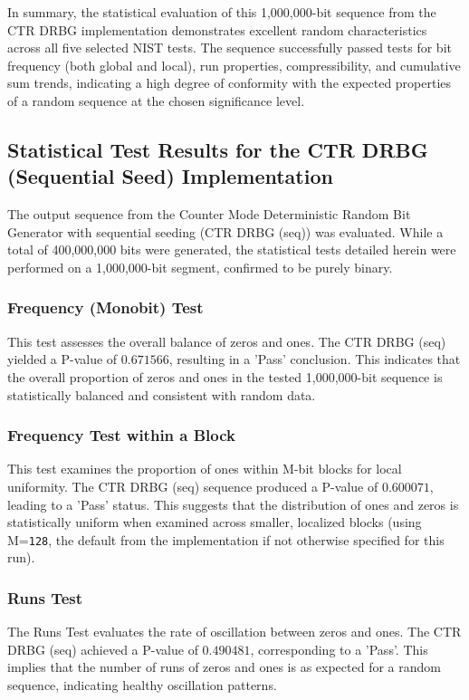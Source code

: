 \noindent 
In summary, the statistical evaluation of this 1,000,000-bit sequence from the CTR DRBG implementation demonstrates excellent random characteristics across all five selected NIST tests. The sequence successfully passed tests for bit frequency (both global and local), run properties, compressibility, and cumulative sum trends, indicating a high degree of conformity with the expected properties of a random sequence at the chosen significance level.

\subsection{Statistical Test Results for the CTR DRBG (Sequential Seed) Implementation} 

The output sequence from the Counter Mode Deterministic Random Bit Generator with sequential seeding (CTR DRBG (seq)) was evaluated. While a total of 400,000,000 bits were generated, the statistical tests detailed herein were performed on a 1,000,000-bit segment, confirmed to be purely binary. 

\subsubsection{\textbf{Frequency (Monobit) Test}}
This test assesses the overall balance of zeros and ones. The CTR DRBG (seq) yielded a P-value of $0.671566$, resulting in a 'Pass' conclusion. This indicates that the overall proportion of zeros and ones in the tested 1,000,000-bit sequence is statistically balanced and consistent with random data.

\subsubsection{\textbf{Frequency Test within a Block}}
This test examines the proportion of ones within M-bit blocks for local uniformity. The CTR DRBG (seq) sequence produced a P-value of $0.600071$, leading to a 'Pass' status. This suggests that the distribution of ones and zeros is statistically uniform when examined across smaller, localized blocks (using M=\texttt{128}, the default from the implementation if not otherwise specified for this run).

\subsubsection{\textbf{Runs Test}}
The Runs Test evaluates the rate of oscillation between zeros and ones. The CTR DRBG (seq) achieved a P-value of $0.490481$, corresponding to a 'Pass'. This implies that the number of runs of zeros and ones is as expected for a random sequence, indicating healthy oscillation patterns.

